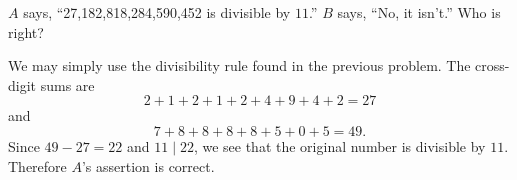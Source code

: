  $A$ says, ``27,182,818,284,590,452 is divisible by
$11$.'' $B$ says, ``No, it isn't.'' Who is right?
\begin{solution}
  We may simply use the divisibility rule found in the previous
  problem. The cross-digit sums are
  \begin{equation*}
    2 + 1 + 2 + 1 + 2 + 4 + 9 + 4 + 2 = 27
  \end{equation*}
  and
  \begin{equation*}
    7 + 8 + 8 + 8 + 8 + 5 + 0 + 5 = 49.
  \end{equation*}
  Since $49 - 27 = 22$ and $11\mid22$, we see that the original number
  is divisible by $11$. Therefore $A$'s assertion is correct.
\end{solution}
